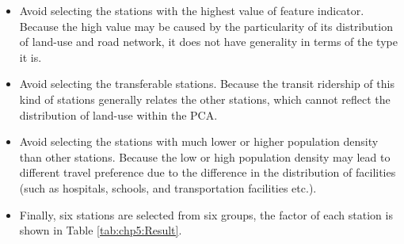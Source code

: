 \begin{itemize}
	\item Avoid selecting the stations with the highest value of feature indicator. Because the high value may be caused by the particularity of its distribution of land-use and road network, it does not have generality in terms of the type it is.
	\item Avoid selecting the transferable stations. Because the transit ridership of this kind of stations generally relates the other stations, which cannot reflect the distribution of land-use within the PCA.
	\item Avoid selecting the stations with much lower or higher population density than other stations. Because the low or high population density may lead to different travel preference due to the difference in the distribution of facilities (such as hospitals, schools, and transportation facilities etc.).
	\item Finally, six stations are selected from six groups, the factor of each station is shown in Table \ref{tab:chp5:Result}.
\end{itemize}


